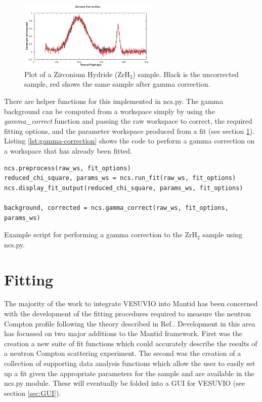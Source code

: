 \documentclass[paper=a4, fontsize=11pt]{scrartcl}	%
\numberwithin{equation}{section}															%
\numberwithin{figure}{section}																%
\numberwithin{table}{section}
\begin{document}
\begin{figure}[H]
\centering
\includegraphics[width=0.6\textwidth]{img/corrections-gamma.png}
\caption{Plot of a Zirconium Hydride (ZrH$_2$) sample. Black is the uncorrected sample, red shows the same sample after gamma correction.}
\label{fig:corrections-gamma}
\end{figure}

There are helper functions for this implemented in ncs.py. The gamma background can be computed from a workspace simply by using the \textit{gamma\_correct} function and passing the raw workspace to correct, the required fitting options, and the parameter workspace produced from a fit (see section \ref{sec:fitting}). Listing \ref{lst:gamma-correction} shows the code to perform a gamma correction on a workspace that has already been fitted.

\begin{listing}[H]
\begin{verbatim}
ncs.preprocess(raw_ws, fit_options)
reduced_chi_square, params_ws = ncs.run_fit(raw_ws, fit_options)
ncs.display_fit_output(reduced_chi_square, params_ws, fit_options)

background, corrected = ncs.gamma_correct(raw_ws, fit_options, params_ws)
\end{verbatim}
\caption{Example script for performing a gamma correction to the ZrH$_2$ sample using ncs.py.}
\label{lst:gamma-correction}
\end{listing}

\section{Fitting}
\label{sec:fitting}
The majority of the work to integrate VESUVIO into Mantid has been concerned with the development of the fitting procedures required to measure the neutron Compton profile following the theory described in Ref.\citep{mayers2012vesuvio}. Development in this area has focussed on two major additions to the Mantid framework. First was the creation a new suite of fit functions which could accurately describe the results of a neutron Compton scattering experiment. The second was the creation of a collection of supporting data analysis functions which allow the user to easily set up a fit given the appropriate parameters for the sample and are available in the ncs.py module. These will eventually be folded into a GUI for VESUVIO (see section \ref{sec:GUI}).
\end{document}
